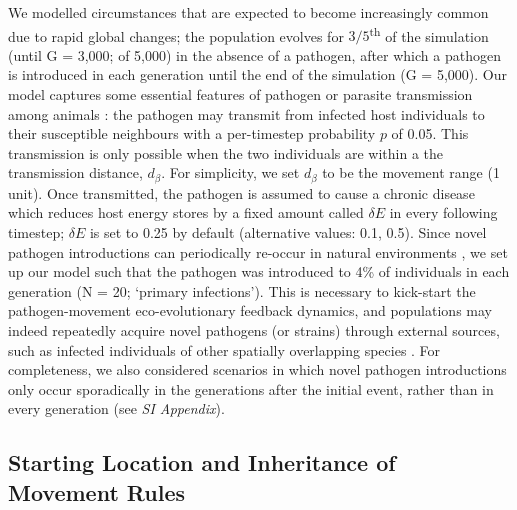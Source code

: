 We modelled circumstances that are expected to become increasingly common due to rapid global changes; the population evolves for $3/5$\textsuperscript{th} of the simulation (until G = 3,000; of 5,000) in the absence of a pathogen, after which a pathogen is introduced in each generation until the end of the simulation (G = 5,000).
Our model captures some essential features of pathogen or parasite transmission among animals \autocite{white2017}: the pathogen may transmit from infected host individuals to their susceptible neighbours with a per-timestep probability $p$ of 0.05.
This transmission is only possible when the two individuals are within a the transmission distance, $d_\beta$.
For simplicity, we set $d_\beta$ to be the movement range (1 unit).
Once transmitted, the pathogen is assumed to cause a chronic disease which reduces host energy stores by a fixed amount called $\delta E$ in every following timestep; $\delta E$ is set to 0.25 by default (alternative values: 0.1, 0.5).
Since novel pathogen introductions can periodically re-occur in natural environments \autocite{jolles2021,bastos2000,vosloo2009,almberg2015,goulson2015,wille2022,carlson2022a}, we set up our model such that the pathogen was introduced to 4\% of individuals in each generation (N = 20; `primary infections').
This is necessary to kick-start the pathogen-movement eco-evolutionary feedback dynamics, and populations may indeed repeatedly acquire novel pathogens (or strains) through external sources, such as infected individuals of other spatially overlapping species \autocite[e.g.][]{kuchipudi2022,wille2022,chandler2021,vosloo2009,bastos2000,monk2022,keeling2001,carlson2022a}.
For completeness, we also considered scenarios in which novel pathogen introductions only occur sporadically in the generations after the initial event, rather than in every generation (see \emph{SI Appendix}).

\subsection*{Starting Location and Inheritance of Movement Rules}

